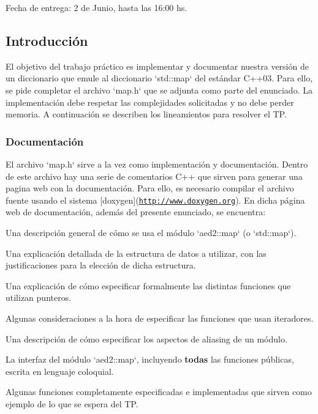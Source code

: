 
\begin{DoxyItemize}
\item \-Fecha de entrega\-: 2 de \-Junio, hasta las 16\-:00 hs.
\end{DoxyItemize}\hypertarget{Enunciado_intro-enunciado}{}\subsection{\-Introducción}\label{Enunciado_intro-enunciado}
\-El objetivo del trabajo práctico es implementar y documentar nuestra versión de un diccionario que emule al diccionario `std\-::map` del estándar \-C++03. \-Para ello, se pide completar el archivo `map.h` que se adjunta como parte del enunciado. \-La implementación debe respetar las complejidades solicitadas y no debe perder memoria. \-A continuación se describen los lineamientos para resolver el \-T\-P.\hypertarget{Enunciado_intro-doc}{}\subsubsection{\-Documentación}\label{Enunciado_intro-doc}
\-El archivo `map.h` sirve a la vez como implementación y documentación. \-Dentro de este archivo hay una serie de comentarios \-C++ que sirven para generar una pagina web con la documentación. \-Para ello, es necesario compilar el archivo fuente usando el sistema \mbox{[}doxygen\mbox{]}(\href{http://www.doxygen.org}{\tt http\-://www.\-doxygen.\-org}). \-En dicha página web de documentación, además del presente enunciado, se encuentra\-:


\begin{DoxyItemize}
\item \-Una descripción general de cómo se usa el módulo `aed2\-::map` (o `std\-::map`).
\item \-Una explicación detallada de la estructura de datos a utilizar, con las justificaciones para la elección de dicha estructura.
\item \-Una explicación de cómo especificar formalmente las distintas funciones que utilizan punteros.
\item \-Algunas consideraciones a la hora de especificar las funciones que usan iteradores.
\item \-Una descripción de cómo especificar los aspectos de aliasing de un módulo.
\item \-La interfaz del módulo `aed2\-::map`, incluyendo {\bfseries todas} las funciones públicas, escrita en lenguaje coloquial.
\item \-Algunas funciones completamente especificadas e implementadas que sirven como ejemplo de lo que se espera del \-T\-P.
\end{DoxyItemize}

